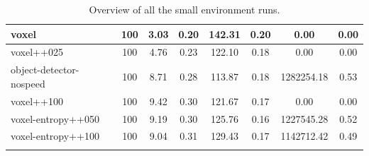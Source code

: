 \begin{table}
\begin{longtable}{|l|c|c| c|c| c|c|c|}
        voxel & 100 & {\cellcolor[HTML]{BDDCD5}} \color[HTML]{000000} 3.03 & {\cellcolor[HTML]{BADAD4}} \color[HTML]{000000} 0.20 & {\cellcolor[HTML]{A0CEC5}} \color[HTML]{000000} 142.31 & 0.20 & 0.00 & 0.00 \\ \hline
        voxel++025 & 100 & {\cellcolor[HTML]{A0CEC5}} \color[HTML]{000000} 4.76 & {\cellcolor[HTML]{99CBC0}} \color[HTML]{000000} 0.23 & {\cellcolor[HTML]{ABD3CB}} \color[HTML]{000000} 122.10 & 0.18 & 0.00 & 0.00 \\ \hline
        object-detector-nospeed & 100 & {\cellcolor[HTML]{60AFA0}} \color[HTML]{F1F1F1} 8.71 & {\cellcolor[HTML]{6FB6A8}} \color[HTML]{F1F1F1} 0.28 & {\cellcolor[HTML]{AFD5CD}} \color[HTML]{000000} 113.87 & 0.18 & 1282254.18 & 0.53 \\ \hline
        voxel++100 & 100 & {\cellcolor[HTML]{55AA99}} \color[HTML]{F1F1F1} 9.42 & {\cellcolor[HTML]{5DAE9D}} \color[HTML]{F1F1F1} 0.30 & {\cellcolor[HTML]{ABD3CB}} \color[HTML]{000000} 121.67 & 0.17 & 0.00 & 0.00 \\ \hline
        voxel-entropy++050 & 100 & {\cellcolor[HTML]{59AC9B}} \color[HTML]{F1F1F1} 9.19 & {\cellcolor[HTML]{59AC9B}} \color[HTML]{F1F1F1} 0.30 & {\cellcolor[HTML]{A9D2CA}} \color[HTML]{000000} 125.76 & 0.16 & 1227545.28 & 0.52 \\ \hline
        voxel-entropy++100 & 100 & {\cellcolor[HTML]{5BAD9C}} \color[HTML]{F1F1F1} 9.04 & {\cellcolor[HTML]{55AA99}} \color[HTML]{F1F1F1} 0.31 & {\cellcolor[HTML]{A7D1C9}} \color[HTML]{000000} 129.43 & 0.17 & 1142712.42 & 0.49 \\ \hline
        
        \caption{Overview of all the small environment runs.}
        \label{tab:results-small-env-voxel}
    \end{longtable}

\end{table}


\newpage


